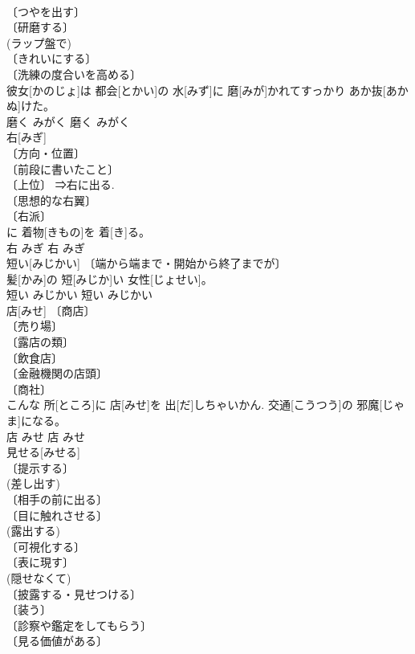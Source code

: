 \documentclass[8pt]{extreport}
\begin{document}
\begin{CJK}{UTF8}{min}
\\	〔つやを出す〕 
\\	〔研磨する〕 
\\	(ラップ盤で) 
\\	〔きれいにする〕 
\\	〔洗練の度合いを高める〕 
\\	彼女[かのじょ]は 都会[とかい]の 水[みず]に 磨[みが]かれてすっかり あか抜[あかぬ]けた。	
\\	磨く	みがく	磨く	みがく	
\\	右[みぎ]	
\\	〔方向・位置〕 
\\	〔前段に書いたこと〕 
\\	〔上位〕 ⇒右に出る. 
\\	〔思想的な右翼〕 
\\	〔右派〕 
\\	[⇒みぎより１ 
\\	右前[みぎまえ]に 着物[きもの]を 着[き]る。	
\\	右	みぎ	右	みぎ	
\\	短い[みじかい]	〔端から端まで・開始から終了までが〕 
\\	[⇒みじかく]	髪[かみ]の 短[みじか]い 女性[じょせい]。	
\\	短い	みじかい	短い	みじかい	
\\	店[みせ]	〔商店〕 
\\	〔売り場〕 
\\	〔露店の類〕 
\\	〔飲食店〕 
\\	〔金融機関の店頭〕 
\\	〔商社〕 
\\	こんな 所[ところ]に 店[みせ]を 出[だ]しちゃいかん. 交通[こうつう]の 邪魔[じゃま]になる。	
\\	店	みせ	店	みせ	
\\	見せる[みせる]	
\\	〔提示する〕 
\\	(差し出す) 
\\	〔相手の前に出る〕 
\\	〔目に触れさせる〕 
\\	(露出する) 
\\	〔可視化する〕 
\\	〔表に現す〕 
\\	(隠せなくて) 
\\	〔披露する・見せつける〕 
\\	〔装う〕 
\\	〔診察や鑑定をしてもらう〕 
\\	〔見る価値がある〕 

\end{CJK}
\end{document}
